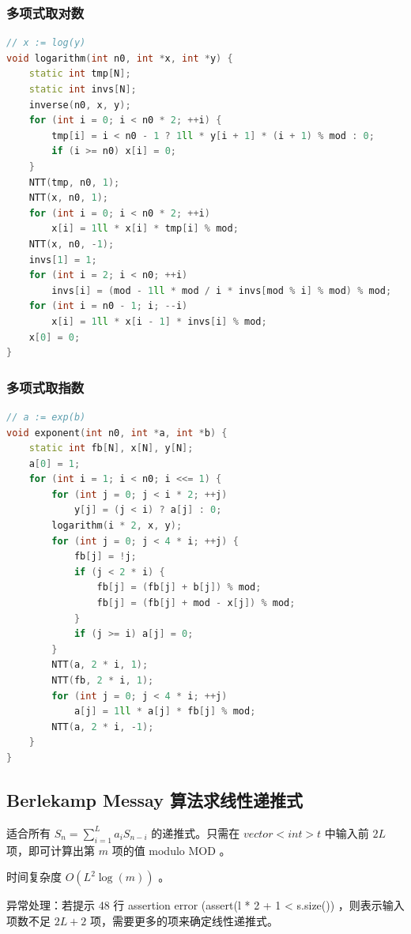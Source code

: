 \documentclass{article}
\begin{document}
\subsubsection{多项式取对数}

\begin{lstlisting}[language=C++]
// x := log(y)
void logarithm(int n0, int *x, int *y) {
	static int tmp[N];
	static int invs[N];
	inverse(n0, x, y);
	for (int i = 0; i < n0 * 2; ++i) {
		tmp[i] = i < n0 - 1 ? 1ll * y[i + 1] * (i + 1) % mod : 0;
		if (i >= n0) x[i] = 0;
	}
	NTT(tmp, n0, 1);
	NTT(x, n0, 1);
	for (int i = 0; i < n0 * 2; ++i)
		x[i] = 1ll * x[i] * tmp[i] % mod;
	NTT(x, n0, -1);
	invs[1] = 1;
	for (int i = 2; i < n0; ++i)
		invs[i] = (mod - 1ll * mod / i * invs[mod % i] % mod) % mod;
	for (int i = n0 - 1; i; --i)
		x[i] = 1ll * x[i - 1] * invs[i] % mod;
	x[0] = 0;
}
\end{lstlisting}

\subsubsection{多项式取指数}

\begin{lstlisting}[language=C++]
// a := exp(b)
void exponent(int n0, int *a, int *b) {
	static int fb[N], x[N], y[N];
	a[0] = 1;
	for (int i = 1; i < n0; i <<= 1) {
		for (int j = 0; j < i * 2; ++j)
			y[j] = (j < i) ? a[j] : 0;
		logarithm(i * 2, x, y);
		for (int j = 0; j < 4 * i; ++j) {
			fb[j] = !j;
			if (j < 2 * i) {
				fb[j] = (fb[j] + b[j]) % mod;
				fb[j] = (fb[j] + mod - x[j]) % mod;
			}
			if (j >= i) a[j] = 0;
		}
		NTT(a, 2 * i, 1);
		NTT(fb, 2 * i, 1);
		for (int j = 0; j < 4 * i; ++j)
			a[j] = 1ll * a[j] * fb[j] % mod;
		NTT(a, 2 * i, -1);
	}
}
\end{lstlisting}

\subsection{Berlekamp Messay 算法求线性递推式}

适合所有 $S_n = \sum\limits_{i = 1}^{L} a_iS_{n - i}$ 的递推式。只需在 $vector<int> t$ 中输入前 $2L$ 项，即可计算出第 $m$ 项的值 modulo MOD 。

时间复杂度 $O(L^2\log{(m)})$ 。

异常处理：若提示 48 行 assertion error (assert(l * 2 + 1 < s.size()) ，则表示输入项数不足 $2L + 2$ 项，需要更多的项来确定线性递推式。
\end{document}
